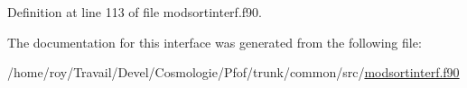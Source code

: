 Definition at line 113 of file modsortinterf.\+f90.



The documentation for this interface was generated from the following file\+:\begin{DoxyCompactItemize}
\item 
/home/roy/\+Travail/\+Devel/\+Cosmologie/\+Pfof/trunk/common/src/\hyperlink{modsortinterf_8f90}{modsortinterf.\+f90}\end{DoxyCompactItemize}
